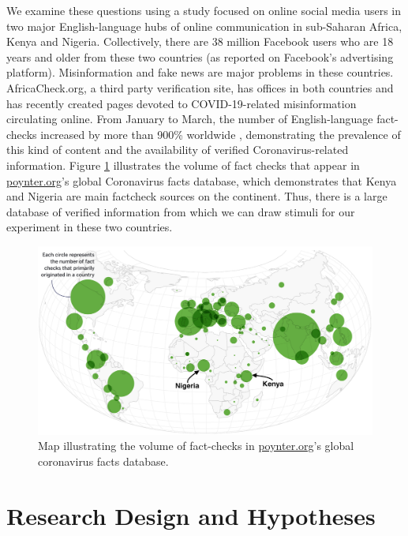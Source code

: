 \documentclass[letterpaper, 12pt, parskip=full,]{scrartcl}
\begin{document}
We examine these questions using a study focused on online social media users in two major English-language hubs of online communication in sub-Saharan Africa, Kenya and Nigeria.  Collectively, there are 38 million Facebook users who are 18 years and older from these two countries (as reported on Facebook's advertising platform). Misinformation and fake news are major problems in these countries. AfricaCheck.org, a third party verification site, has offices in both countries and has recently created pages devoted to COVID-19-related misinformation circulating online. From January to March, the number of English-language fact-checks increased by more than 900\% worldwide \citep{brennen2020types}, demonstrating the prevalence of this kind of content and the availability of verified Coronavirus-related information.  Figure \ref{fig:poynter} illustrates the volume of fact checks that appear in \url{poynter.org}'s global Coronavirus facts database, which demonstrates that Kenya and Nigeria are main factcheck sources on the continent. Thus, there is a large database of verified information from which we can draw stimuli for our experiment in these two countries. 


\begin{figure}[htb]
\centering
\caption{Map illustrating the volume of fact-checks in \url{poynter.org}'s global coronavirus facts database.}
\label{fig:poynter}
\includegraphics[width=.95\textwidth]{poynter2.png}
\end{figure}


\section{Research Design and Hypotheses}
\end{document}
